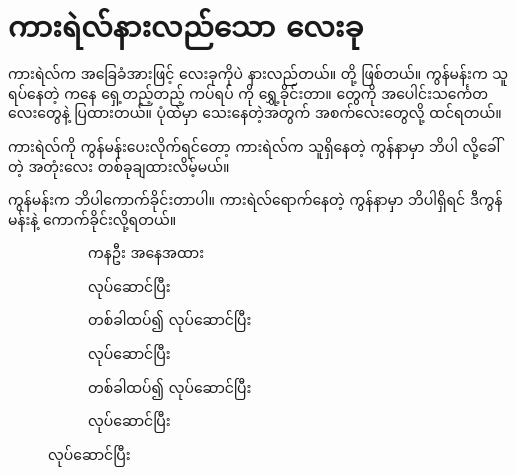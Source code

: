 \begin{sloppypar}
\section{ကားရဲလ်နားလည်သော \mmcommand လေးခု}
ကားရဲလ်က အခြေခံအားဖြင့် \mmcommand လေးခုကိုပဲ နားလည်တယ်။  \mmcommand တို့ ဖြစ်တယ်။  ကွန်မန်းက သူရပ်နေတဲ့ \mmcorner ကနေ ရှေ့တည့်တည့် ကပ်ရပ် \mmcorner ကို ရွှေ့ခိုင်းတာ။ \mmcorner ‌တွေကို အပေါင်းသင်္ကေတ လေးတွေနဲ့ ပြထားတယ်။ ပုံထဲမှာ သေးနေတဲ့အတွက် အစက်လေးတွေလို့ ထင်ရတယ်။ 

ကားရဲလ်ကို  ကွန်မန်းပေးလိုက်ရင်တော့ ကားရဲလ်က သူရှိနေတဲ့ ကွန်နာမှာ ဘိပါ လို့ခေါ်တဲ့ အတုံးလေး တစ်ခုချထားလိမ့်မယ်။ 

 ကွန်မန်းက ဘိပါကောက်ခိုင်းတာပါ။ ကားရဲလ်ရောက်နေတဲ့ ကွန်နာမှာ ဘိပါရှိရင် ဒီကွန်မန်းနဲ့ ကောက်ခိုင်းလို့ရတယ်။ 

\begin{figure}[tbh!]
    \begin{subfigure}[t]{0.46\textwidth}
        \caption{ကနဦး အနေအထား}
    \end{subfigure}
    \hspace{0.1in}
    \begin{subfigure}[t]{0.46\textwidth}
        \caption{ \mmcommand လုပ်ဆောင်ပြီး}
    \end{subfigure}

    \begin{subfigure}[t]{0.46\textwidth}
        \caption{ \mmcommand တစ်ခါထပ်၍ လုပ်ဆောင်ပြီး}
    \end{subfigure}
    \hspace{0.12in}
    \begin{subfigure}[t]{0.46\textwidth}
        \caption{ \mmcommand လုပ်ဆောင်ပြီး}
    \end{subfigure}

    \begin{subfigure}[t]{0.46\textwidth}
        \caption{ \mmcommand တစ်ခါထပ်၍ လုပ်ဆောင်ပြီး}
    \end{subfigure}
    \hspace{0.1in}
    \begin{subfigure}[t]{0.46\textwidth}
        \caption{ \mmcommand လုပ်ဆောင်ပြီး}        
    \end{subfigure}


\end{figure}
\end{sloppypar}
